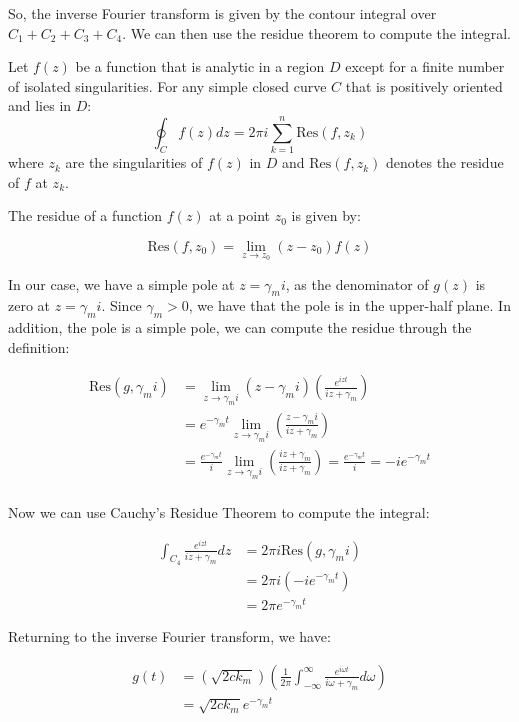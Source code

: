 So, the inverse Fourier transform is given by the contour integral over $C_1 + C_2 + C_3 + C_4$. We can then use the residue theorem to compute the integral.

\begin{untheorem}
    Let $f(z)$ be a function that is analytic in a region $D$ except for a finite number of isolated singularities. For any simple closed curve $C$ that is positively oriented and lies in $D$:
    $$
    \oint_C f(z)dz = 2\pi i\sum_{k=1}^{n} \text{Res}(f,z_k)
    $$
    where $z_k$ are the singularities of $f(z)$ in $D$ and $\text{Res}(f,z_k)$ denotes the residue of $f$ at $z_k$.
\end{untheorem}

The residue of a function $f(z)$ at a point $z_0$ is given by:

$$
\text{Res}(f,z_0) = \lim_{z\to z_0} (z-z_0)f(z)
$$

In our case, we have a simple pole at $z = \gamma_m i$, as the denominator of $g(z)$ is zero at $z = \gamma_m i$. Since $\gamma_m > 0$, we have that the pole is in the upper-half plane. In addition, the pole is a simple pole, we can compute the residue through the definition:

\begin{align*}
\text{Res}(g,\gamma_m i) &= \lim_{z\to \gamma_m i} (z-\gamma_m i)\left(\frac{e^{izt}}{iz+\gamma_m}\right)\\
&= e^{-\gamma_mt}\lim_{z\to \gamma_m i} \left(\frac{z-\gamma_m i}{iz+\gamma_m}\right)\\
&= \frac{e^{-\gamma_mt}}{i}\lim_{z\to \gamma_m i} \left(\frac{iz +\gamma_m}{iz+\gamma_m}\right) = \frac{e^{-\gamma_mt}}{i} = -ie^{-\gamma_mt}\\
\end{align*}

Now we can use Cauchy's Residue Theorem to compute the integral:

\begin{align*}
\int_{C_4}\frac{e^{iz t}}{iz+\gamma_m}dz &= 2\pi i\text{Res}(g,\gamma_m i)\\
&= 2\pi i\left(-ie^{-\gamma_mt}\right)\\
&= 2\pi e^{-\gamma_mt}
\end{align*}

Returning to the inverse Fourier transform, we have:

\begin{align*}
g(t) &= \left(\sqrt{2ck_m}\right)\left(\frac{1}{2\pi}\int_{-\infty}^{\infty}\frac{e^{i\omega t}}{i\omega+\gamma_m}d\omega\right)\\
&= \sqrt{2ck_m}e^{-\gamma_mt}
\end{align*}


